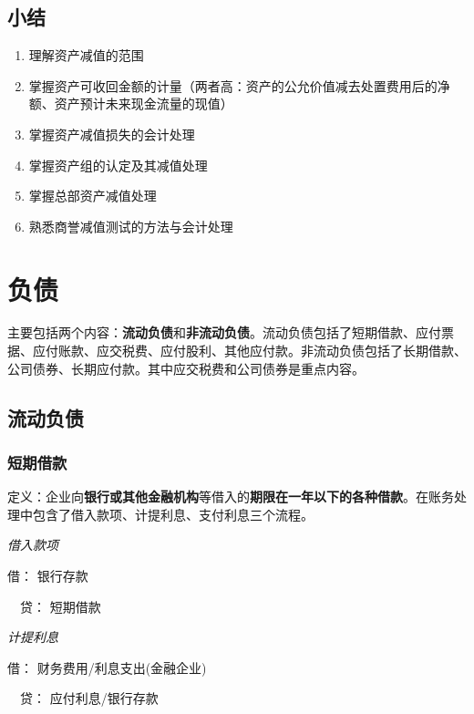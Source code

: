 \documentclass[UTF8,12pt]{ctexart}
\newenvironment{Dr}{\noindent 借：}{\par}
\newenvironment{Cr}{\noindent \ \ 贷：}{\par}
\numberwithin{equation}{section} %
\numberwithin{figure}{section}
\numberwithin{table}{section}
\begin{document}
	\subsection{小结}
	\begin{enumerate}
		\item 理解资产减值的范围
		
		\item 掌握资产可收回金额的计量（两者高：资产的公允价值减去处置费用后的净额、资产预计未来现金流量的现值）
		
		\item 掌握资产减值损失的会计处理
		
		\item 掌握资产组的认定及其减值处理
		
		\item 掌握总部资产减值处理
		
		\item 熟悉商誉减值测试的方法与会计处理 
	\end{enumerate}
	
	\newpage
	\section{负债}
	主要包括两个内容：\textbf{流动负债}和\textbf{非流动负债}。流动负债包括了短期借款、应付票据、应付账款、应交税费、应付股利、其他应付款。非流动负债包括了长期借款、公司债券、长期应付款。其中应交税费和公司债券是重点内容。
	
	\subsection{流动负债}
	
	\subsubsection{短期借款}
	定义：企业向\textbf{银行或其他金融机构}等借入的\textbf{期限在一年以下的各种借款}。在账务处理中包含了借入款项、计提利息、支付利息三个流程。
	
	\textit{借入款项}
	
	\begin{Dr}
		银行存款
	\end{Dr}
	\begin{Cr}
		短期借款
	\end{Cr}

	
	\textit{计提利息}
	
	\begin{Dr}
		财务费用/利息支出(金融企业)
	\end{Dr}
	\begin{Cr}
		应付利息/银行存款
	\end{Cr}
\end{document}
